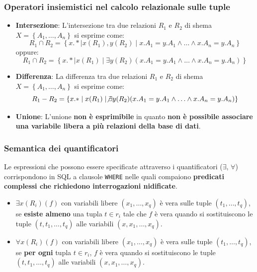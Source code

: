 \documentclass[a4paper,twoside]{article}
\begin{document}
\subsubsection{Operatori insiemistici nel calcolo relazionale sulle tuple}
\begin{itemize}
  \item \textbf{Intersezione}:
    L'intersezione tra due relazioni \( R_1 \) e \( R_2 \) di shema
    \( X = \left\{ A_1, \ldots, A_n \right\} \) si esprime come:
    \[
      R_1 \cap R_2 = \left\{ x.* \mid x(R_1), y(R_2) \mid
      x.A_1 = y.A_1 \land \ldots \land x.A_n = y.A_n \right\}
    \] 
    oppure:
    \[
      R_1 \cap R_2 = \left\{ x.* \mid x(R_1) \mid
        \exists y(R_2)(
          x.A_1 = y.A_1 \land \ldots \land x.A_n = y.A_n
        ) \right\}
      \] 

    \item \textbf{Differenza}: 
      La differenza tra due relazioni \( R_1 \) e \( R_2 \) di shema
      \( X = \left\{ A_1, \ldots, A_n \right\} \) si esprime come:
      \[
        R_1 - R_2 = \left\{ x.* \mid x(R_1) \mid
          \not \exists y(R_2)(
            x.A_1 = y.A_1 \land \ldots \land x.A_n = y.A_n
          ) \right\}
      \]

    \item \textbf{Unione}:
      L'unione \textbf{non è esprimibile} in quanto \textbf{non è possibile associare
      una variabile libera a più relazioni della base di dati}.
\end{itemize}

\subsubsection{Semantica dei quantificatori}
Le espressioni che possono essere specificate attraverso i quantificatori (\( \exists  \),
\( \forall  \)) corrispondono in SQL a clausole \texttt{WHERE} nelle quali compaiono
\textbf{predicati complessi che richiedono interrogazioni nidificate}.
\begin{itemize}
  \item \( \exists x (R_i)(f) \) con variabili libere \( (x_1, \ldots, x_q) \) è
    vera sulle tuple \( (t_1, \ldots, t_q) \), se \textbf{esiste almeno} una tupla
    \( t \in r_i \) tale che \( f \) è vera quando si sostituiscono le tuple
    \( (t, t_1, \ldots, t_q) \) alle variabili \( (x, x_1, \ldots, x_q) \).

  \item \( \forall x (R_i)(f) \) con variabili libere \( (x_1, \ldots, x_q) \) è
    vera sulle tuple \( (t_1, \ldots, t_q) \), se \textbf{per ogni} tupla
    \( t \in r_i \), \( f \) è vera quando si sostituiscono le tuple
    \( (t, t_1, \ldots, t_q) \) alle variabili \( (x, x_1, \ldots, x_q) \).
\end{itemize}
\end{document}
